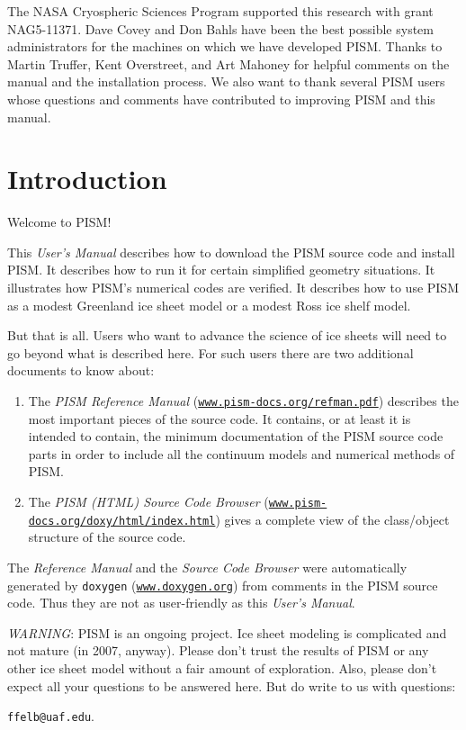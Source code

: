 \documentclass[11pt,final]{amsart}
\renewcommand{\t}[1]{\texttt{#1}}
\begin{document}
The NASA Cryospheric Sciences Program supported this research with grant NAG5-11371.  Dave Covey and Don Bahls have been the best possible system administrators for the machines on which we have developed PISM.  Thanks to Martin Truffer, Kent Overstreet, and Art Mahoney for helpful comments on the manual and the installation process.  We also want to thank several PISM users whose questions and comments have contributed to improving PISM and this manual.

\newpage
\setcounter{tocdepth}{2}
\tableofcontents


\newpage
\section{Introduction}\label{sect:intro}

Welcome to PISM!

This \emph{User's Manual} describes how to download the PISM source code and install PISM.  It describes how to run it for certain simplified geometry situations.  It illustrates how PISM's numerical codes are verified.  It describes how to use PISM as a modest Greenland ice sheet model or a modest Ross ice shelf model.

But that is all.  Users who want to advance the science of ice sheets will need to go beyond what is described here.  For such users there are two additional documents to know about:
\begin{enumerate}
 \item  The \emph{PISM Reference Manual} (\href{http://www.pism-docs.org/refman.pdf}{\t{www.pism-docs.org/refman.pdf}})
describes the most important pieces of the source code.  It contains, or at least it is intended to contain, the minimum documentation of the PISM source code parts in order to include all the continuum models and numerical methods of PISM.
 \item  The \emph{PISM (HTML) Source Code Browser} (\href{http://www.pism-docs.org/doxy/html/index.html}{\t{www.pism-docs.org/doxy/html/index.html}}) gives a complete view of the class/object structure of the source code.
\end{enumerate}
The \emph{Reference Manual} and the \emph{Source Code Browser} were automatically generated by \verb|doxygen| (\href{http://www.doxygen.org/}{\t{www.doxygen.org}}) from comments in the PISM source code.  Thus they are not as user-friendly as this \emph{User's Manual}.

\vspace{1.5in}
\large
\begin{center}
 \emph{WARNING}:  PISM is an ongoing project.  Ice sheet modeling is complicated and not mature (in 2007, anyway).  Please don't trust the results of PISM or any other ice sheet model without a fair amount of exploration.  Also, please don't expect all your questions to be answered here.  But do write to us with questions: 

\verb|ffelb@uaf.edu|.
\end{center}
\normalsize
\end{document}
